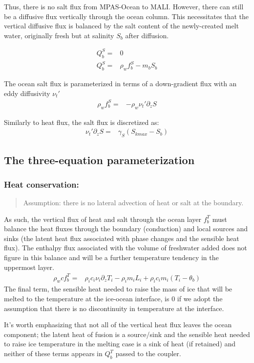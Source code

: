 \documentclass[11pt]{report}
\newcommand{\bea}{\begin{eqnarray}}
\newcommand{\eea}{\end{eqnarray}}
\begin{document}
Thus, there is no salt flux from MPAS-Ocean to MALI. However, there can still be a diffusive flux vertically through the ocean column. This necessitates that the vertical diffusive flux is balanced by the salt content of the newly-created melt water, originally fresh but at salinity $S_b$ after diffusion.

\bea
    Q_b^S =& 0\\
    Q_b^S =& \rho_w f_b^S - m_b S_b
\eea

The ocean salt flux is parameterized in terms of a down-gradient flux with an eddy diffusivity $\nu_t'$
\bea
    \rho_w f_b^S =& -\rho_w \nu_t' \partial_z S
\eea

Similarly to heat flux, the salt flux is discretized as:
\bea
    \nu_t' \partial_z S =& \gamma_S(S_{kmax} - S_b)
\eea

\subsection{The three-equation parameterization}

\subsubsection{Heat conservation:}

\begin{quote}
    Assumption: there is no lateral advection of heat or salt at the boundary.
\end{quote}

As such, the vertical flux of heat and salt through the ocean layer $f_b^T$ must balance the heat fluxes through the boundary (conduction) and local sources and sinks (the latent heat flux associated with phase changes and the sensible heat flux). The enthalpy flux associated with the volume of freshwater added does not figure in this balance and will be a further temperature tendency in the uppermost layer.
\bea
    \rho_w c f_b^T =&\rho_i c_i \nu_i \partial_z T_i -\rho_i m_i L_i + \rho_i c_i m_i (T_i - \theta_b)\label{eq:ocean_heat_flux_a}
\eea
The final term, the sensible heat needed to raise the mass of ice that will be melted to the temperature at the ice-ocean interface, is 0 if we adopt the assumption that there is no discontinuity in temperature at the interface.

It's worth emphasizing that not all of the vertical heat flux leaves the ocean component; the latent heat of fusion is a source/sink and the sensible heat needed to raise ice temperature in the melting case is a sink of heat (if retained) and neither of these terms appears in $Q_b^T$ passed to the coupler.
\end{document}

